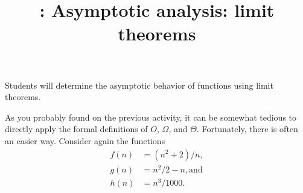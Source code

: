 \documentclass{tufte-handout}
\title{\thecourse: Asymptotic analysis: limit theorems}
\date{}
\begin{document}
\maketitle

\begin{objective}
  Students will determine the asymptotic behavior of functions using
  limit theorems.
\end{objective}
As you probably found on the previous activity, it can be somewhat
tedious to directly apply the formal definitions of $O$, $\Omega$, and
$\Theta$.  Fortunately, there is often an easier way.  Consider again
the functions
\begin{align*}
  f(n) &= (n^2 + 2)/n, \\ g(n) &= n^2/2 - n, \text{and} \\ h(n) &= n^3/1000.
\end{align*}
\end{document}
